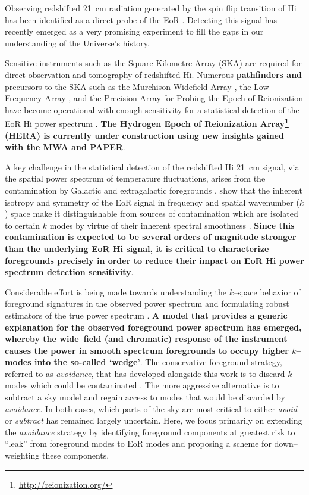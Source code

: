 \documentclass[preprint2,iop,numberedappendix]{emulateapj}
\begin{document}
Observing redshifted 21~cm radiation generated by the spin flip transition of H{\sc i} has been identified as a direct probe of the EoR \citep{sun72,sco90,mad97,toz00,ili02}. Detecting this signal has recently emerged as a very promising experiment to fill the gaps in our understanding of the Universe's history.  

Sensitive instruments such as the Square Kilometre Array (SKA) are required for direct observation and tomography of redshifted H{\sc i}. Numerous {\bf pathfinders and} precursors to the SKA such as the Murchison Widefield Array \citep[MWA;][]{lon09,tin13,bow13}, the Low Frequency Array \citep[LOFAR;][]{van13}, and the Precision Array for Probing the Epoch of Reionization \citep[PAPER;][]{par10} have become operational with enough sensitivity for a statistical detection of the EoR H{\sc i} power spectrum \citep{bow06,par12a,bea13,dil13,thy13,pob14}. {\bf The Hydrogen Epoch of Reionization Array\footnote{\url{http://reionization.org/}} (HERA) is currently under construction using new insights gained with the MWA and PAPER}.

A key challenge in the statistical detection of the redshifted H{\sc i} 21~cm signal, via the spatial power spectrum of temperature fluctuations, arises from the contamination by Galactic and extragalactic foregrounds \citep[see, e.g.,][]{dim02,zal04,fur06,ali08,ber09,ber10,gho12}. \citet{mor04} show that the inherent isotropy and symmetry of the EoR signal in frequency and spatial wavenumber ($k$) space make it distinguishable from sources of contamination which are isolated to certain $k$ modes by virtue of their inherent spectral smoothness \citep{mor06,bow09,liu11,par12b,dil13,pob13}. {\bf Since this contamination is expected to be several orders of magnitude stronger than the underlying EoR H{\sc i} signal, it is critical to characterize foregrounds precisely in order to reduce their impact on EoR H{\sc i} power spectrum detection sensitivity}. 

Considerable effort is being made towards understanding the $k$--space behavior of foreground signatures in the observed power spectrum and formulating robust estimators of the true power spectrum \citep{bow09,liu09,dat10,liu11,mor12,tro12,pob13,thy13,dil14,liu14a,liu14b}. {\bf A model that provides a generic explanation for the observed foreground power spectrum has emerged, whereby the wide--field (and chromatic) response of the instrument causes the power in smooth spectrum foregrounds to occupy higher $k$--modes into the so-called `wedge'}. The conservative foreground strategy, referred to as {\it avoidance}, that has developed alongside this work is to discard $k$--modes which could be contaminated \citep[e.g.,][]{par14}. The more aggressive alternative is to subtract a sky model and regain access to modes that would be discarded by {\it avoidance}. In both cases, which parts of the sky are most critical to either {\it avoid} or {\it subtract} has remained largely uncertain. Here, we focus primarily on extending the {\it avoidance} strategy by identifying foreground components at greatest risk to ``leak'' from foreground modes to EoR modes and proposing a scheme for down--weighting these components.
\end{document}
